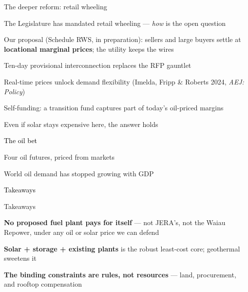 \documentclass[11pt,aspectratio=169]{beamer}
\begin{document}
\begin{frame}{The deeper reform: retail wheeling}
\begin{wideitemize}
  \item The Legislature has mandated retail wheeling --- \emph{how} is
        the open question
  \item Our proposal (Schedule RWS, in preparation): sellers and large
        buyers settle at \textbf{locational marginal prices}; the
        utility keeps the wires
  \item Ten-day provisional interconnection replaces the RFP gauntlet
  \item Real-time prices unlock demand flexibility
        (Imelda, Fripp \& Roberts 2024, \emph{AEJ: Policy})
  \item Self-funding: a transition fund captures part of today's
        oil-priced margins
\end{wideitemize}
\end{frame}

\begin{frame}{Even if solar stays expensive here, the answer holds}
\end{frame}

\begin{transitionframe}
  \begin{center}{\Huge \textcolor{black}{The oil bet}}\end{center}
\end{transitionframe}

\begin{frame}{Four oil futures, priced from markets}
\end{frame}

\begin{frame}{World oil demand has stopped growing with GDP}
\end{frame}

\begin{transitionframe}
  \begin{center}{\Huge \textcolor{black}{Takeaways}}\end{center}
\end{transitionframe}

\begin{frame}{Takeaways}
\begin{wideitemize}
  \item \textbf{No proposed fuel plant pays for itself} --- not JERA's,
        not the Waiau Repower, under any oil or solar price we can defend
  \item \textbf{Solar + storage + existing plants} is the robust
        least-cost core; geothermal sweetens it
  \item \textbf{The binding constraints are rules, not resources} ---
        land, procurement, and rooftop compensation
\end{wideitemize}
\end{frame}
\end{document}
